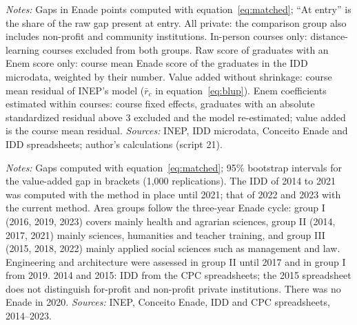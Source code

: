 \documentclass[12pt,letterpaper]{article}
\begin{document}
\begin{table}[!htbp]
\centering\small
\caption{Federal minus private for-profit courses of the same area under alternative specifications, Enade 2022 and 2023}\label{tab:altspec}
\resizebox{\linewidth}{!}{}
\begin{minipage}{\linewidth}\vspace{0.4em}\scriptsize
\textit{Notes:} Gaps in Enade points computed with equation~\eqref{eq:matched}; ``At entry'' is the share of the raw gap present at entry. All private: the comparison group also includes non-profit and community institutions. In-person courses only: distance-learning courses excluded from both groups. Raw score of graduates with an Enem score only: course mean Enade score of the graduates in the IDD microdata, weighted by their number. Value added without shrinkage: course mean residual of INEP's model ($\bar r_c$ in equation~\eqref{eq:blup}). Enem coefficients estimated within courses: course fixed effects, graduates with an absolute standardized residual above 3 excluded and the model re-estimated; value added is the course mean residual. \textit{Sources:} INEP, IDD microdata, Conceito Enade and IDD spreadsheets; author's calculations (script 21).
\end{minipage}
\end{table}

\begin{table}[!htbp]
\centering\small
\caption{Federal minus private courses of the same area, every Enade edition with course-level IDD}\label{tab:series}
\resizebox{\linewidth}{!}{}
\begin{minipage}{\linewidth}\vspace{0.4em}\scriptsize
\textit{Notes:} Gaps computed with equation~\eqref{eq:matched}; 95\% bootstrap intervals for the value-added gap in brackets (1,000 replications). The IDD of 2014 to 2021 was computed with the method in place until 2021; that of 2022 and 2023 with the current method. Area groups follow the three-year Enade cycle: group I (2016, 2019, 2023) covers mainly health and agrarian sciences, group II (2014, 2017, 2021) mainly sciences, humanities and teacher training, and group III (2015, 2018, 2022) mainly applied social sciences such as management and law. Engineering and architecture were assessed in group II until 2017 and in group I from 2019. 2014 and 2015: IDD from the CPC spreadsheets; the 2015 spreadsheet does not distinguish for-profit and non-profit private institutions. There was no Enade in 2020. \textit{Sources:} INEP, Conceito Enade, IDD and CPC spreadsheets, 2014--2023.
\end{minipage}
\end{table}
\end{document}
